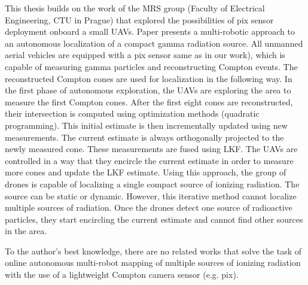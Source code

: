 This thesis builds on the work of the MRS group (Faculty of Electrical Engineering, CTU in Prague) that explored the possibilities of \ac{pix} sensor deployment onboard a small \ac{UAV}s. 
Paper \cite{baca2021gamma} presents a multi-robotic approach to an autonomous localization of a compact gamma radiation source. 
All unmanned aerial vehicles are equipped with a \ac{pix} sensor same as in our work), which is capable of measuring gamma particles and reconstructing Compton events. 
The reconstructed Compton cones are used for localization in the following way.
In the first phase of autonomous exploration, the \ac{UAV}s are exploring the area to measure the first Compton cones. 
After the first eight cones are reconstructed, their intersection is computed using optimization methods (quadratic programming). 
This initial estimate is then incrementally updated using new measurements. 
The current estimate is always orthogonally projected to the newly measured cone. 
These measurements are fused using \ac{LKF}. 
The \ac{UAV}s are controlled in a way that they encircle the current estimate in order to measure more cones and update the \ac{LKF} estimate.
Using this approach, the group of drones is capable of localizing a single compact source of ionizing radiation. 
The source can be static or dynamic. 
However, this iterative method cannot localize multiple sources of radiation.
Once the drones detect one source of radioactive particles, they start encircling the current estimate and cannot find other sources in the area.

To the author's best knowledge, there are no related works that solve the task of online autonomous multi-robot mapping of multiple sources of ionizing radiation with the use of a lightweight Compton camera sensor (e.g. \ac{pix}).

